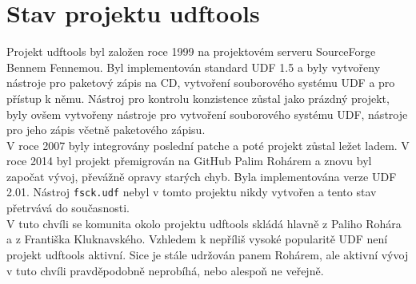 \section{Stav projektu udftools}
Projekt udftools byl založen roce 1999 na projektovém serveru SourceForge \cite{udftools-sourceforge} Bennem Fennemou. Byl implementován standard UDF 1.5 a byly vytvořeny nástroje pro paketový zápis na CD, vytvoření souborového systému UDF a pro přístup k němu. Nástroj pro kontrolu konzistence zůstal jako prázdný projekt, byly ovšem vytvořeny nástroje pro vytvoření souborového systému UDF, nástroje pro jeho zápis včetně paketového zápisu.\\
V roce 2007 byly integrovány poslední patche a poté projekt zůstal ležet ladem. V roce 2014 byl projekt přemigrován na GitHub \cite{udftools-github} Palim Rohárem a znovu byl započat vývoj, převážně opravy starých chyb. Byla implementována verze UDF 2.01. Nástroj \texttt{fsck.udf} nebyl v tomto projektu nikdy vytvořen a tento stav přetrvává do současnosti.\\
V tuto chvíli se komunita okolo projektu udftools skládá hlavně z Paliho Rohára a z Františka Kluknavského. Vzhledem k nepříliš vysoké popularitě UDF není projekt udftools aktivní. Sice je stále udržován panem Rohárem, ale aktivní vývoj v tuto chvíli pravděpodobně neprobíhá, nebo alespoň ne veřejně.

